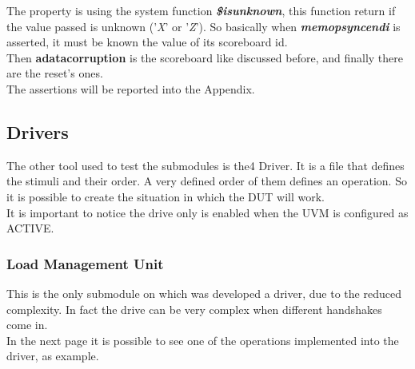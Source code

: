 The property is using the system function \textbf{\emph{\$isunknown}}, this function return if the value passed is unknown ('\emph{X}' or '\emph{Z}'). So basically when \textbf{\emph{memop\+sync\+end\+i}} is asserted, it must be known the value of its scoreboard id.\\


Then  \textbf{a\+data\+corruption} is the scoreboard like discussed before, and finally there are the reset's ones.\\
The assertions will be reported into the Appendix.\\




\subsection{Drivers}
The other tool used to test the submodules is the4 Driver. It is a file that defines the stimuli and their order. A very defined order of them defines an operation. So it is possible to create the situation in which the DUT will work.\\

It is important to notice the drive only is enabled when the UVM is configured as ACTIVE.

\subsubsection{Load Management Unit}
This is the only submodule on which was developed a driver, due to the reduced complexity. In fact the drive can be very complex when different handshakes come in.\\

In the next page it is possible to see one of the operations implemented into the driver, as example.
\newpage

